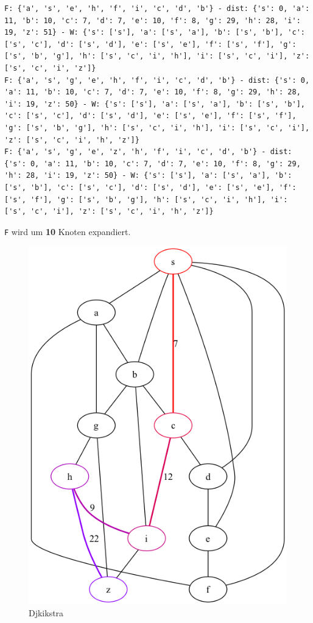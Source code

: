 \documentclass[a4paper,11pt]{report}
\begin{document}
\begin{verbatim}
F: {'a', 's', 'e', 'h', 'f', 'i', 'c', 'd', 'b'} - dist: {'s': 0, 'a': 11, 'b': 10, 'c': 7, 'd': 7, 'e': 10, 'f': 8, 'g': 29, 'h': 28, 'i': 19, 'z': 51} - W: {'s': ['s'], 'a': ['s', 'a'], 'b': ['s', 'b'], 'c': ['s', 'c'], 'd': ['s', 'd'], 'e': ['s', 'e'], 'f': ['s', 'f'], 'g': ['s', 'b', 'g'], 'h': ['s', 'c', 'i', 'h'], 'i': ['s', 'c', 'i'], 'z': ['s', 'c', 'i', 'z']}
F: {'a', 's', 'g', 'e', 'h', 'f', 'i', 'c', 'd', 'b'} - dist: {'s': 0, 'a': 11, 'b': 10, 'c': 7, 'd': 7, 'e': 10, 'f': 8, 'g': 29, 'h': 28, 'i': 19, 'z': 50} - W: {'s': ['s'], 'a': ['s', 'a'], 'b': ['s', 'b'], 'c': ['s', 'c'], 'd': ['s', 'd'], 'e': ['s', 'e'], 'f': ['s', 'f'], 'g': ['s', 'b', 'g'], 'h': ['s', 'c', 'i', 'h'], 'i': ['s', 'c', 'i'], 'z': ['s', 'c', 'i', 'h', 'z']}
F: {'a', 's', 'g', 'e', 'z', 'h', 'f', 'i', 'c', 'd', 'b'} - dist: {'s': 0, 'a': 11, 'b': 10, 'c': 7, 'd': 7, 'e': 10, 'f': 8, 'g': 29, 'h': 28, 'i': 19, 'z': 50} - W: {'s': ['s'], 'a': ['s', 'a'], 'b': ['s', 'b'], 'c': ['s', 'c'], 'd': ['s', 'd'], 'e': ['s', 'e'], 'f': ['s', 'f'], 'g': ['s', 'b', 'g'], 'h': ['s', 'c', 'i', 'h'], 'i': ['s', 'c', 'i'], 'z': ['s', 'c', 'i', 'h', 'z']}
\end{verbatim}

\texttt{F} wird um \textbf{10} Knoten expandiert.

\begin{figure}[htbp]
    \centering
    \includegraphics[height=0.2\textheight]{notebooks/assets/aufgabe_05/djikstra}
    \caption{Djkikstra}
    \label{fig:djkistra_graph}
\end{figure}
\end{document}

